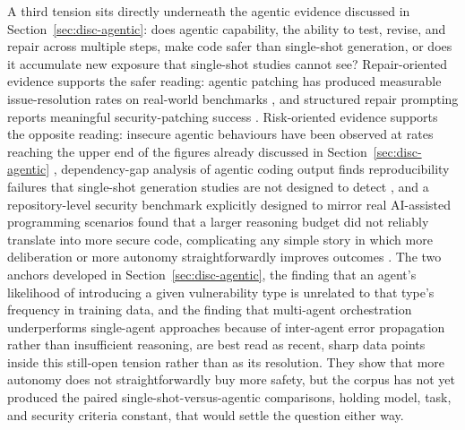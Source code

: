 A third tension sits directly underneath the agentic evidence discussed in Section~\ref{sec:disc-agentic}: does agentic capability, the ability to test, revise, and repair across multiple steps, make code safer than single-shot generation, or does it accumulate new exposure that single-shot studies cannot see? Repair-oriented evidence supports the safer reading: agentic patching has produced measurable issue-resolution rates on real-world benchmarks \cite{aleithan_swe-bench_2024}, and structured repair prompting reports meaningful security-patching success \cite{alrashedy_can_2024}. Risk-oriented evidence supports the opposite reading: insecure agentic behaviours have been observed at rates reaching the upper end of the figures already discussed in Section~\ref{sec:disc-agentic} \cite{kozak_when_2025}, dependency-gap analysis of agentic coding output finds reproducibility failures that single-shot generation studies are not designed to detect \cite{vangala_ai-generated_2026}, and a repository-level security benchmark explicitly designed to mirror real AI-assisted programming scenarios found that a larger reasoning budget did not reliably translate into more secure code, complicating any simple story in which more deliberation or more autonomy straightforwardly improves outcomes \cite{lian_ase_2025}. The two anchors developed in Section~\ref{sec:disc-agentic}, the finding that an agent's likelihood of introducing a given vulnerability type is unrelated to that type's frequency in training data, and the finding that multi-agent orchestration underperforms single-agent approaches because of inter-agent error propagation rather than insufficient reasoning, are best read as recent, sharp data points inside this still-open tension rather than as its resolution. They show that more autonomy does not straightforwardly buy more safety, but the corpus has not yet produced the paired single-shot-versus-agentic comparisons, holding model, task, and security criteria constant, that would settle the question either way.

